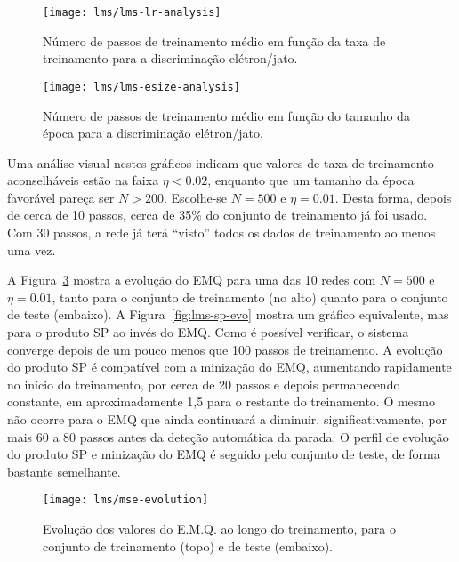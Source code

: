 \begin{figure}
\begin{center}
\texttt{[image: lms/lms-lr-analysis]}
\end{center}
\caption{Número de passos de treinamento médio em função da taxa de
treinamento para a discriminação elétron/jato.}
\label{fig:lms-lr-analysis}
\end{figure}

\begin{figure}
\begin{center}
\texttt{[image: lms/lms-esize-analysis]}
\end{center}
\caption{Número de passos de treinamento médio em função do tamanho da
época para a discriminação elétron/jato.}
\label{fig:lms-esize-analysis}
\end{figure}

Uma análise visual nestes gráficos indicam que valores de taxa de treinamento
aconselháveis estão na faixa $\eta < 0.02$, enquanto que um tamanho da época
favorável pareça ser $N > 200$. Escolhe-se $N = 500$ e $\eta = 0.01$. Desta
forma, depois de cerca de 10 passos, cerca de 35\% do conjunto de treinamento
já foi usado. Com 30 passos, a rede já terá ``visto'' todos os dados de
treinamento ao menos uma vez.

A Figura~\ref{fig:lms-mse-evo} mostra a evolução do EMQ para uma das 10 redes
com $N = 500$ e $\eta = 0.01$, tanto para o conjunto de treinamento (no alto)
quanto para o conjunto de teste (embaixo). A Figura~\ref{fig:lms-sp-evo}
mostra um gráfico equivalente, mas para o produto SP ao invés do EMQ. Como é
possível verificar, o sistema converge depois de um pouco menos que 100 passos
de treinamento. A evolução do produto SP é compatível com a minização do EMQ,
aumentando rapidamente no início do treinamento, por cerca de 20 passos e
depois permanecendo constante, em aproximadamente 1,5 para o restante do
treinamento. O mesmo não ocorre para o EMQ que ainda continuará a diminuir,
significativamente, por mais 60 a 80 passos antes da deteção automática da
parada. O perfil de evolução do produto SP e minização do EMQ é seguido
pelo conjunto de teste, de forma bastante semelhante.

\begin{figure}
\begin{center}
\texttt{[image: lms/mse-evolution]}
\end{center}
\caption{Evolução dos valores do E.M.Q. ao longo do treinamento, para o
conjunto de treinamento (topo) e de teste (embaixo).}
\label{fig:lms-mse-evo}
\end{figure}

